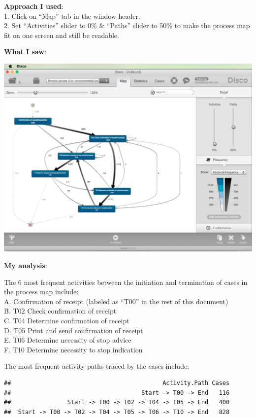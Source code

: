 \documentclass[]{article}
\begin{document}
\textbf{Approach I used}:\\1. Click on ``Map'' tab in the window
header.\\2. Set ``Activities'' slider to 0\% \& ``Paths'' slider to 50\%
to make the process map fit on one screen and still be readable.

\textbf{What I saw}:

\includegraphics{CoSeLoG_Step_02.png}

\textbf{My analysis}:

The 6 most frequent activities between the initiation and termination of
cases in the process map include:\\A. Confirmation of receipt (labeled
as ``T00'' in the rest of this document)\\B. T02 Check confirmation of
receipt\\C. T04 Determine confirmation of receipt\\D. T05 Print and send
confirmation of receipt\\E. T06 Determine necessity of stop advice\\F.
T10 Determine necessity to stop indication

The most frequent activity paths traced by the cases include:

\begin{verbatim}
##                                           Activity.Path Cases
##                                     Start -> T00 -> End   116
##                Start -> T00 -> T02 -> T04 -> T05 -> End   400
##  Start -> T00 -> T02 -> T04 -> T05 -> T06 -> T10 -> End   828
\end{verbatim}
\end{document}
